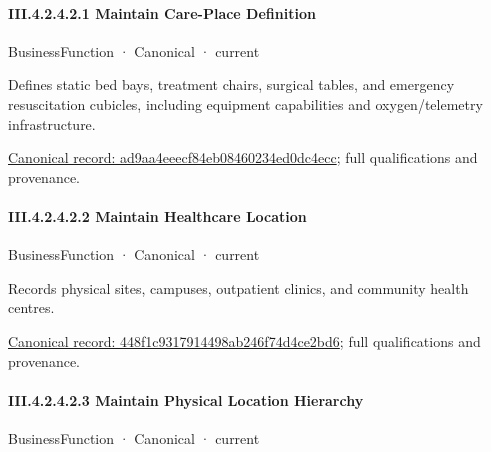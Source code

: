 \paragraph*{III.4.2.4.2.1 Maintain Care-Place Definition}
\label{navigation:III.4.2.4.2.1}

\label{element:ad9aa4eeecf84eb08460234ed0dc4ecc}
{\small BusinessFunction · Canonical · current}\par

Defines static bed bays, treatment chairs, surgical tables, and emergency resuscitation cubicles, including equipment capabilities and oxygen/telemetry infrastructure.


{\footnotesize \href{../../../../../../../continuum/business/business-function/ad9aa4eeecf84eb08460234ed0dc4ecc.md}{Canonical record: ad9aa4eeecf84eb08460234ed0dc4ecc}; full qualifications and provenance.}\par
\paragraph*{III.4.2.4.2.2 Maintain Healthcare Location}
\label{navigation:III.4.2.4.2.2}

\label{element:448f1c9317914498ab246f74d4ce2bd6}
{\small BusinessFunction · Canonical · current}\par

Records physical sites, campuses, outpatient clinics, and community health centres.


{\footnotesize \href{../../../../../../../continuum/business/business-function/448f1c9317914498ab246f74d4ce2bd6.md}{Canonical record: 448f1c9317914498ab246f74d4ce2bd6}; full qualifications and provenance.}\par
\paragraph*{III.4.2.4.2.3 Maintain Physical Location Hierarchy}
\label{navigation:III.4.2.4.2.3}

\label{element:d217a5cd3a3d40e9a89068d1680ec45f}
{\small BusinessFunction · Canonical · current}\par

